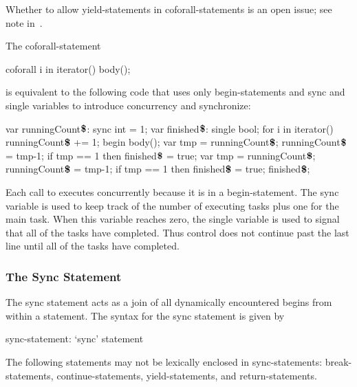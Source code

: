 \begin{openissue}
Whether to allow yield-statements in coforall-statements is an open
issue; see note in~.
\end{openissue}

\begin{example}
The coforall-statement
\begin{chapel}
coforall i in iterator() {
  body();
}
\end{chapel}
is equivalent to the following code that uses only begin-statements
and sync and single variables to introduce concurrency and
synchronize:
\begin{chapel}
var runningCount$\mbox{{\bf \$}}$: sync int = 1;
var finished$\mbox{{\bf \$}}$: single bool;
for i in iterator() {
  runningCount$\mbox{{\bf \$}}$ += 1;
  begin {
    body();
    var tmp = runningCount$\mbox{{\bf \$}}$;
    runningCount$\mbox{{\bf \$}}$ = tmp-1;
    if tmp == 1 then finished$\mbox{{\bf \$}}$ = true;
  }
}
var tmp = runningCount$\mbox{{\bf \$}}$;
runningCount$\mbox{{\bf \$}}$ = tmp-1;
if tmp == 1 then finished$\mbox{{\bf \$}}$ = true;
finished$\mbox{{\bf \$}}$;
\end{chapel}
Each call to  executes concurrently because it is in a
begin-statement.  The sync
variable  is used to keep track of
the number of executing tasks plus one for the main task.  When this
variable reaches zero, the single
variable  is used to signal that all
of the tasks have completed.  Thus control does not continue past the
last line until all of the tasks have completed.
\end{example}

\subsubsection{The Sync Statement}
\label{Sync_Statement}

The sync statement acts as a join of all dynamically encountered
begins from within a statement.  The syntax for the sync statement is
given by
\begin{syntax}
sync-statement:
  `sync' statement
\end{syntax}
The following statements may not be lexically enclosed in
sync-statements: break-statements, continue-statements,
yield-statements, and return-statements.

